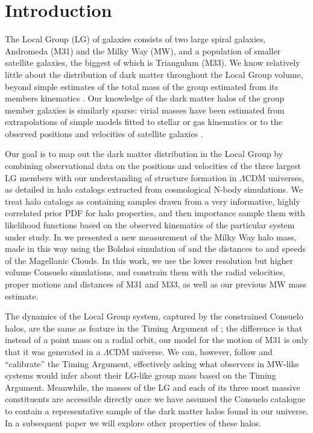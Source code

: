 \documentclass[iop,apj]{emulateapj}
\newcommand{\bolshoi}{{\sc Bolshoi }}
\newcommand{\consuelo}{{\sc Consuelo }}
\begin{document}


\section{Introduction}
\label{sec:intro}

The Local Group (LG) of galaxies consists of two large spiral galaxies,
Andromeda (M31) and the Milky Way (MW), and a population of smaller
satellite galaxies, the biggest of which is Triangulum (M33). We know
relatively little about the distribution of dark matter throughout the Local
Group volume, beyond simple estimates of the total mass of the group
estimated from its members kinematics \citep[e.g.\ ][hereafter VG08]{vdM+G08}.
Our knowledge of the dark matter halos of the group member galaxies is
similarly sparse: virial masses have been estimated from extrapolations of
simple models fitted to stellar or gas kinematics \citep[e.g.\
][]{Xue+08,M31rotcurve} or to the observed positions and 
velocities of satellite galaxies \citep[e.g.\ ][]{EvansEtc}. 

Our goal is to map out the dark matter distribution in the Local Group
by combining observational data on the  positions and velocities of the
three largest LG members with our understanding of structure formation
in $\Lambda$CDM universes, as detailed in halo catalogs extracted from
cosmological N-body simulations. We treat halo catalogs as containing
samples drawn from a very informative, highly correlated prior PDF for
halo properties, and then  importance sample them with likelihood
functions based on the observed kinematics of the particular system
under study. In \citet[][hereafter B11]{Bus++11} we presented a new
measurement of the Milky Way halo mass, made in this way using the
\bolshoi simulation of \citet{Bolshoi} and the distances to and speeds
of the Magellanic Clouds. In this work, we use the lower resolution but
higher volume \consuelo simulations, and constrain them with the radial
velocities, proper motions and distances of M31 and M33, as well as our
previous MW mass estimate.

The dynamics of the Local Group system, captured by the constrained
\consuelo halos, are the same as feature in the Timing Argument of
\citet{K+W59}; the difference is that instead of a point mass on a
radial orbit, our model for the motion of M31 is only that it was
generated in a $\Lambda$CDM universe. We can, however, follow
\citet{L+W08} and ``calibrate'' the Timing Argument, effectively asking
what observers in MW-like systems would infer about their LG-like group
mass based on the Timing Argument.  Meanwhile, the masses of the LG and
each of its three most massive constituents are accessible directly once
we have assumed the \consuelo catalogue to contain a representative
sample of the dark matter halos found in our universe. In a subsequent
paper we will explore other properties of these halos.
\end{document}
